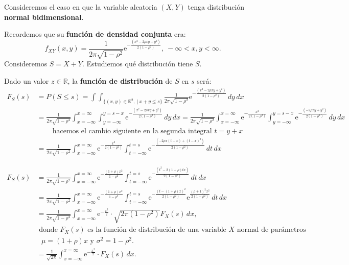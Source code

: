 \documentclass[]{book}
\begin{document}
Consideremos el caso en que la variable aleatoria \((X,Y)\) tenga distribución \textbf{normal bidimensional}.

Recordemos que su \textbf{función de densidad conjunta} era:
\[
f_{XY}(x,y)=\frac{1}{2\pi\sqrt{1-\rho^2}}\mathrm{e}^{-\frac{(x^2-2\rho xy+y^2)}{2(1-\rho^2)}},\ -\infty <x,y<\infty.
\]
Consideremos \(S=X+Y\). Estudiemos qué distribución tiene \(S\).

Dado un valor \(z\in\mathbb{R}\), la \textbf{función de distribución} de \(S\) en \(s\) será:
\[
\begin{array}{rl}
F_S(s) & =P(S\leq s)=\int\int_{\{(x,y)\in\mathbb{R}^2,\ |\ x+y\leq s\}}\frac{1}{2\pi\sqrt{1-\rho^2}}\mathrm{e}^{-\frac{(x^2-2\rho xy+y^2)}{2(1-\rho^2)}}\, dy\, dx \\ & =
\frac{1}{2\pi\sqrt{1-\rho^2}} \int_{x=-\infty}^{x=\infty}\int_{y=-\infty}^{y=s-x}\mathrm{e}^{-\frac{(x^2-2\rho xy+y^2)}{2(1-\rho^2)}}\, dy\, dx = \frac{1}{2\pi\sqrt{1-\rho^2}} \int_{x=-\infty}^{x=\infty} \mathrm{e}^{-\frac{x^2}{2(1-\rho^2)}} \int_{y=-\infty}^{y=s-x}\mathrm{e}^{-\frac{(-2\rho xy+y^2)}{2(1-\rho^2)}}\, dy\, dx  \\ &\ \qquad\mbox{hacemos el cambio siguiente en la segunda integral $t=y+x$}\\ & = \frac{1}{2\pi\sqrt{1-\rho^2}} \int_{x=-\infty}^{x=\infty} \mathrm{e}^{-\frac{x^2}{2(1-\rho^2)}} \int_{t=-\infty}^{t=s}\mathrm{e}^{-\frac{(-2\rho x(t-x)+(t-x)^2)}{2(1-\rho^2)}}\, dt\, dx 
\end{array}
\]

\[
\begin{array}{rl}
F_S(s) & =  \frac{1}{2\pi\sqrt{1-\rho^2}} \int_{x=-\infty}^{x=\infty} \mathrm{e}^{-\frac{(1+\rho)x^2}{1-\rho^2}}\int_{t=-\infty}^{t=s} \mathrm{e}^{-\frac{(t^2-2(1+\rho) t x)}{2(1-\rho^2)}}\, dt\, dx \\ & = \frac{1}{2\pi\sqrt{1-\rho^2}} \int_{x=-\infty}^{x=\infty} \mathrm{e}^{-\frac{(1+\rho)x^2}{1-\rho^2}}\int_{t=-\infty}^{t=s} \mathrm{e}^{-\frac{(t-(1+\rho)x)^2}{2(1-\rho^2)}} \mathrm{e}^{\frac{(\rho+1)^2 x^2}{2(1-\rho^2)}}\, dt\, dx  \\ & = \frac{1}{2\pi\sqrt{1-\rho^2}} \int_{x=-\infty}^{x=\infty} \mathrm{e}^{-\frac{x^2}{2}}\cdot \sqrt{2\pi (1-\rho^2)} F_X(s)\, dx, \\ & \mbox{ donde $F_X(s)$ es la función de distribución de una variable $X$ normal de parámetros} \\ & \mbox{ $\mu =(1+\rho)x$ y $\sigma^2=1-\rho^2$.} \\ & = \frac{1}{\sqrt{2\pi}}\int_{x=-\infty}^{x=\infty} \mathrm{e}^{-\frac{x^2}{2}}\cdot F_X(s)\, dx.
\end{array}
\]
\end{document}
